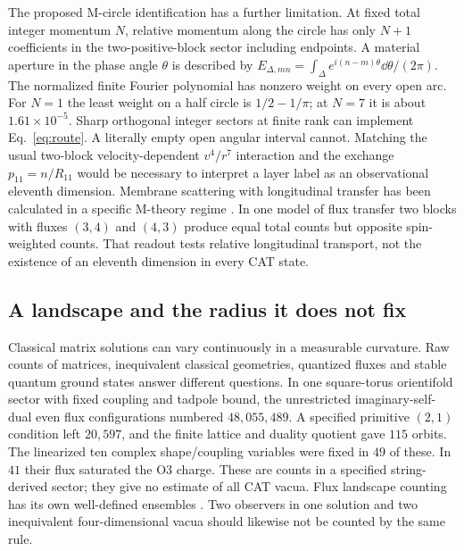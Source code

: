The proposed M-circle identification has a further limitation. At fixed total integer momentum \(N\), relative momentum along the circle has only \(N+1\) coefficients in the two-positive-block sector including endpoints. A material aperture in the phase angle \(\theta\) is described by \(E_{\Delta,mn}=\int_\Delta e^{i(n-m)\theta}\dd\theta/(2\pi)\). The normalized finite Fourier polynomial has nonzero weight on every open arc. For \(N=1\) the least weight on a half circle is \(1/2-1/\pi\); at \(N=7\) it is about \(1.61\times10^{-5}\). Sharp orthogonal integer sectors at finite rank can implement Eq.~\eqref{eq:route}. A literally empty open angular interval cannot. Matching the usual two-block velocity-dependent \(v^4/r^7\) interaction and the exchange \(p_{11}=n/R_{11}\) would be necessary to interpret a layer label as an observational eleventh dimension. Membrane scattering with longitudinal transfer has been calculated in a specific M-theory regime \cite{momentum}. In one model of flux transfer two blocks with fluxes \((3,4)\) and \((4,3)\) produce equal total counts but opposite spin-weighted counts. That readout tests relative longitudinal transport, not the existence of an eleventh dimension in every CAT state.

\subsection{A landscape and the radius it does not fix}
Classical matrix solutions can vary continuously in a measurable curvature. Raw counts of matrices, inequivalent classical geometries, quantized fluxes and stable quantum ground states answer different questions. In one square-torus orientifold sector with fixed coupling and tadpole bound, the unrestricted imaginary-self-dual even flux configurations numbered \(48{,}055{,}489\). A specified primitive \((2,1)\) condition left \(20{,}597\), and the finite lattice and duality quotient gave \(115\) orbits. The linearized ten complex shape/coupling variables were fixed in \(49\) of these. In \(41\) their flux saturated the O3 charge. These are counts in a specified string-derived sector; they give no estimate of all CAT vacua. Flux landscape counting has its own well-defined ensembles \cite{denef}. Two observers in one solution and two inequivalent four-dimensional vacua should likewise not be counted by the same rule.

